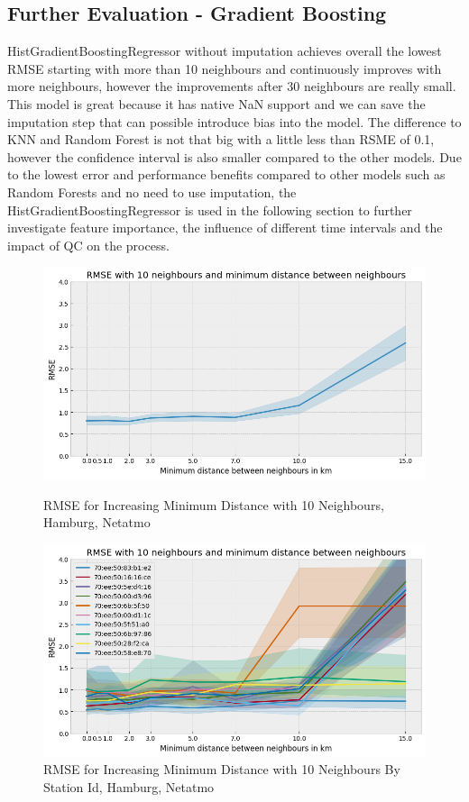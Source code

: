 \subsection{Further Evaluation - Gradient Boosting}

HistGradientBoostingRegressor without imputation achieves overall the lowest RMSE starting with more than 10 neighbours and continuously improves with more neighbours, however the improvements after 30 neighbours are really small. This model is great because it has native NaN support and we can save the imputation step that can possible introduce bias into the model. The difference to KNN and Random Forest is not that big with a little less than RSME of 0.1, however the confidence interval is also smaller compared to the other models. Due to the lowest error and performance benefits compared to other models such as Random Forests and no need to use imputation, the HistGradientBoostingRegressor is used in the following section to further investigate feature importance, the influence of different time intervals and the impact of QC on the process.\\

\begin{figure}[htp]
    \centering
    \includegraphics[width=1\textwidth]{images/rmse_10_neighbours_min_distance.png}
    \caption{RMSE for Increasing Minimum Distance with 10 Neighbours, Hamburg, Netatmo}
    \label{fig:eval hamburg minimum distance between stations}

    \centering
    \includegraphics[width=1\textwidth]{images/rmse_10_neighbours_min_distance_by_pid.png}
    \caption{RMSE for Increasing Minimum Distance with 10 Neighbours By Station Id, Hamburg, Netatmo}
    \label{fig:eval hamburg minimum distance between stations by station id}
\end{figure}

